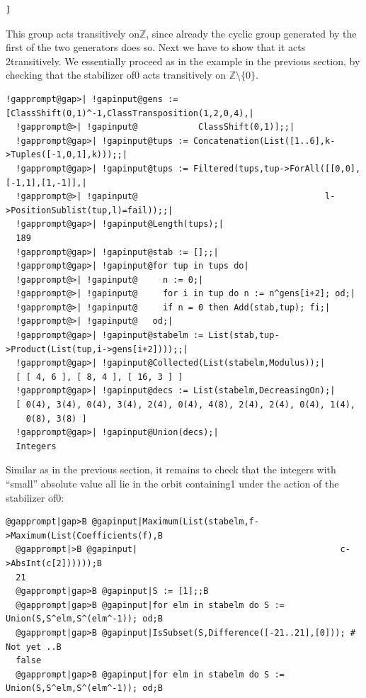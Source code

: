 \documentclass[a4paper,11pt]{report}
\begin{document}
{{\begin{Verbatim}[commandchars=!@A,fontsize=\small,frame=single,label=Example]
  ]
\end{Verbatim}
 This group acts transitively on{\nobreakspace}{\ensuremath{\mathbb Z}}, since
already the cyclic group generated by the first of the two generators does so.
Next we have to show that it acts 2\texttt{}transitively. We
essentially proceed as in the example in the previous section, by checking
that the stabilizer of{\nobreakspace}0 acts transitively on ${\ensuremath{\mathbb Z}} \setminus \{0\}$. 
\begin{Verbatim}[commandchars=!@|,fontsize=\small,frame=single,label=Example]
  !gapprompt@gap>| !gapinput@gens := [ClassShift(0,1)^-1,ClassTransposition(1,2,0,4),|
  !gapprompt@>| !gapinput@            ClassShift(0,1)];;|
  !gapprompt@gap>| !gapinput@tups := Concatenation(List([1..6],k->Tuples([-1,0,1],k)));;|
  !gapprompt@gap>| !gapinput@tups := Filtered(tups,tup->ForAll([[0,0],[-1,1],[1,-1]],|
  !gapprompt@>| !gapinput@                                     l->PositionSublist(tup,l)=fail));;|
  !gapprompt@gap>| !gapinput@Length(tups);|
  189
  !gapprompt@gap>| !gapinput@stab := [];;|
  !gapprompt@gap>| !gapinput@for tup in tups do|
  !gapprompt@>| !gapinput@     n := 0;|
  !gapprompt@>| !gapinput@     for i in tup do n := n^gens[i+2]; od;|
  !gapprompt@>| !gapinput@     if n = 0 then Add(stab,tup); fi;|
  !gapprompt@>| !gapinput@   od;|
  !gapprompt@gap>| !gapinput@stabelm := List(stab,tup->Product(List(tup,i->gens[i+2])));;|
  !gapprompt@gap>| !gapinput@Collected(List(stabelm,Modulus));|
  [ [ 4, 6 ], [ 8, 4 ], [ 16, 3 ] ]
  !gapprompt@gap>| !gapinput@decs := List(stabelm,DecreasingOn);|
  [ 0(4), 3(4), 0(4), 3(4), 2(4), 0(4), 4(8), 2(4), 2(4), 0(4), 1(4), 
    0(8), 3(8) ]
  !gapprompt@gap>| !gapinput@Union(decs);|
  Integers
\end{Verbatim}
 Similar as in the previous section, it remains to check that the integers with ``small'' absolute value all lie in the orbit containing{\nobreakspace}1 under the
action of the stabilizer of{\nobreakspace}0: 
\begin{Verbatim}[commandchars=@|B,fontsize=\small,frame=single,label=Example]
  @gapprompt|gap>B @gapinput|Maximum(List(stabelm,f->Maximum(List(Coefficients(f),B
  @gapprompt|>B @gapinput|                                        c->AbsInt(c[2])))));B
  21
  @gapprompt|gap>B @gapinput|S := [1];;B
  @gapprompt|gap>B @gapinput|for elm in stabelm do S := Union(S,S^elm,S^(elm^-1)); od;B
  @gapprompt|gap>B @gapinput|IsSubset(S,Difference([-21..21],[0])); # Not yet ..B
  false
  @gapprompt|gap>B @gapinput|for elm in stabelm do S := Union(S,S^elm,S^(elm^-1)); od;B

\end{Verbatim}}}
\end{document}
